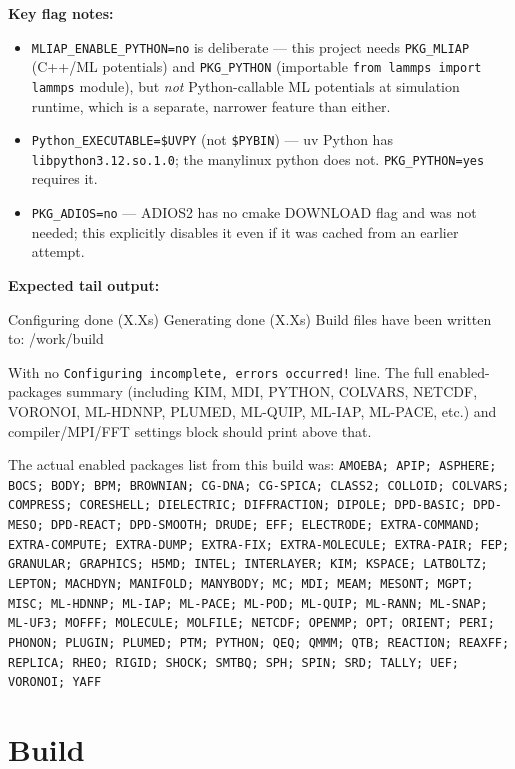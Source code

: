 \documentclass[11pt]{article}
\begin{document}
\textbf{Key flag notes:}
\begin{itemize}
  \item \texttt{MLIAP\_ENABLE\_PYTHON=no} is deliberate --- this project needs
    \texttt{PKG\_MLIAP} (C++/ML potentials) and \texttt{PKG\_PYTHON}
    (importable \texttt{from lammps import lammps} module), but \emph{not}
    Python-callable ML potentials at simulation runtime, which is a separate,
    narrower feature than either.
  \item \texttt{Python\_EXECUTABLE=\$UVPY} (not \texttt{\$PYBIN}) --- uv
    Python has \texttt{libpython3.12.so.1.0}; the manylinux python does not.
    \texttt{PKG\_PYTHON=yes} requires it.
  \item \texttt{PKG\_ADIOS=no} --- ADIOS2 has no cmake DOWNLOAD flag and was
    not needed; this explicitly disables it even if it was cached from an
    earlier attempt.
\end{itemize}

\textbf{Expected tail output:}
\begin{codebox}[]
Configuring done (X.Xs)
Generating done (X.Xs)
Build files have been written to: /work/build
\end{codebox}

With no \texttt{Configuring incomplete, errors occurred!} line.  The full
enabled-packages summary (including KIM, MDI, PYTHON, COLVARS, NETCDF,
VORONOI, ML-HDNNP, PLUMED, ML-QUIP, ML-IAP, ML-PACE, etc.) and
compiler/MPI/FFT settings block should print above that.

The actual enabled packages list from this build was:
\texttt{AMOEBA; APIP; ASPHERE; BOCS; BODY; BPM; BROWNIAN; CG-DNA; CG-SPICA;
CLASS2; COLLOID; COLVARS; COMPRESS; CORESHELL; DIELECTRIC; DIFFRACTION; DIPOLE;
DPD-BASIC; DPD-MESO; DPD-REACT; DPD-SMOOTH; DRUDE; EFF; ELECTRODE;
EXTRA-COMMAND; EXTRA-COMPUTE; EXTRA-DUMP; EXTRA-FIX; EXTRA-MOLECULE;
EXTRA-PAIR; FEP; GRANULAR; GRAPHICS; H5MD; INTEL; INTERLAYER; KIM; KSPACE;
LATBOLTZ; LEPTON; MACHDYN; MANIFOLD; MANYBODY; MC; MDI; MEAM; MESONT; MGPT;
MISC; ML-HDNNP; ML-IAP; ML-PACE; ML-POD; ML-QUIP; ML-RANN; ML-SNAP; ML-UF3;
MOFFF; MOLECULE; MOLFILE; NETCDF; OPENMP; OPT; ORIENT; PERI; PHONON; PLUGIN;
PLUMED; PTM; PYTHON; QEQ; QMMM; QTB; REACTION; REAXFF; REPLICA; RHEO; RIGID;
SHOCK; SMTBQ; SPH; SPIN; SRD; TALLY; UEF; VORONOI; YAFF}

\section{Build}
\label{sec:build}
\end{document}
